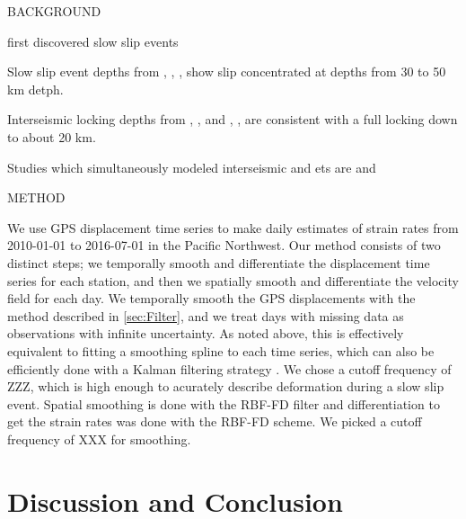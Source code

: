 \documentclass[10pt,a4paper]{article}
\begin{document}
BACKGROUND

\citet{Dragert2001} first discovered slow slip events

Slow slip event depths from \citet{Dragert2001}, \citet{Wech2009}, \citet{Schmidt2010}, \citet{Bartlow2011} show slip concentrated at depths from 30 to 50 km detph.
 
Interseismic locking depths from \citet{Fluck1997}, \citet{Murray2000}, \citet{McCaffrey2007} and \citet{McCaffrey2013}, \citet{Burgette2009}, \citet{schmalzle2014} are consistent with a full locking down to about 20 km.

Studies which simultaneously modeled interseismic and ets are \citet{Holtkamp2010} and \citet{schmalzle2014}

METHOD

We use GPS displacement time series to make daily estimates of strain rates from 2010-01-01 to 2016-07-01 in the Pacific Northwest.  Our method consists of two distinct steps; we temporally smooth and differentiate the displacement time series for each station, and then we spatially smooth and differentiate the velocity field for each day.  We temporally smooth the GPS displacements with the method described in \ref{sec:Filter}, and we treat days with missing data as observations with infinite uncertainty. As noted above, this is effectively equivalent to fitting a smoothing spline to each time series, which can also be efficiently done with a Kalman filtering strategy \citep{Kohn1987}.  We chose a cutoff frequency of ZZZ, which is high enough to acurately describe deformation during a slow slip event.  Spatial smoothing is done with the RBF-FD filter and differentiation to get the strain rates was done with the RBF-FD scheme.  We picked a cutoff frequency of XXX for smoothing.

\section{Discussion and Conclusion}\label{sec:Discussion}



\end{document}
